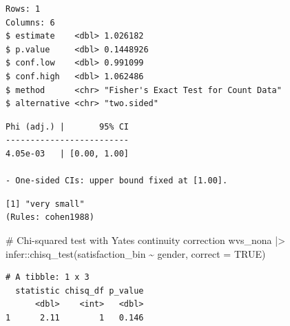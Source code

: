 \documentclass[
  letterpaper,
]{krantz}
\makeatletter
\newenvironment{Shaded}{\begin{snugshade}}{\end{snugshade}}
\newcommand{\AttributeTok}[1]{\textcolor[rgb]{0.40,0.45,0.13}{#1}}
\newcommand{\CommentTok}[1]{\textcolor[rgb]{0.37,0.37,0.37}{#1}}
\newcommand{\ConstantTok}[1]{\textcolor[rgb]{0.56,0.35,0.01}{#1}}
\newcommand{\DocumentationTok}[1]{\textcolor[rgb]{0.37,0.37,0.37}{\textit{#1}}}
\newcommand{\FunctionTok}[1]{\textcolor[rgb]{0.28,0.35,0.67}{#1}}
\newcommand{\NormalTok}[1]{\textcolor[rgb]{0.00,0.23,0.31}{#1}}
\newcommand{\OtherTok}[1]{\textcolor[rgb]{0.00,0.23,0.31}{#1}}
\newcommand{\SpecialCharTok}[1]{\textcolor[rgb]{0.37,0.37,0.37}{#1}}
\newcommand{\StringTok}[1]{\textcolor[rgb]{0.13,0.47,0.30}{#1}}
\newenvironment{kframe}{%
\medskip{}
\setlength{\fboxsep}{.8em}
 \def\at@end@of@kframe{}%
 \ifinner\ifhmode%
  \def\at@end@of@kframe{\end{minipage}}%
  \begin{minipage}{\columnwidth}%
 \fi\fi%
 \def\FrameCommand##1{\hskip\@totalleftmargin \hskip-\fboxsep
 \colorbox{shadecolor}{##1}\hskip-\fboxsep
     \hskip-\linewidth \hskip-\@totalleftmargin \hskip\columnwidth}%
 \MakeFramed {\advance\hsize-\width
   \@totalleftmargin\z@ \linewidth\hsize
   \@setminipage}}%
 {\par\unskip\endMakeFramed%
 \at@end@of@kframe}
\renewenvironment{Shaded}{\begin{kframe}}{\end{kframe}}
\makeatother
\begin{document}
\begin{verbatim}
Rows: 1
Columns: 6
$ estimate    <dbl> 1.026182
$ p.value     <dbl> 0.1448926
$ conf.low    <dbl> 0.991099
$ conf.high   <dbl> 1.062486
$ method      <chr> "Fisher's Exact Test for Count Data"
$ alternative <chr> "two.sided"
\end{verbatim}

\begin{Shaded}
\end{Shaded}

\begin{verbatim}
Phi (adj.) |       95% CI
-------------------------
4.05e-03   | [0.00, 1.00]

- One-sided CIs: upper bound fixed at [1.00].
\end{verbatim}

\begin{Shaded}
\end{Shaded}

\begin{verbatim}
[1] "very small"
(Rules: cohen1988)
\end{verbatim}

\begin{Shaded}
\begin{Highlighting}[]
\CommentTok{\# Chi{-}squared test with Yate\textquotesingle{}s continuity correction}
\NormalTok{wvs\_nona }\SpecialCharTok{|\textgreater{}}\NormalTok{ infer}\SpecialCharTok{::}\FunctionTok{chisq\_test}\NormalTok{(satisfaction\_bin }\SpecialCharTok{\textasciitilde{}}\NormalTok{ gender,}
                               \AttributeTok{correct =} \ConstantTok{TRUE}\NormalTok{)}
\end{Highlighting}
\end{Shaded}

\begin{verbatim}
# A tibble: 1 x 3
  statistic chisq_df p_value
      <dbl>    <int>   <dbl>
1      2.11        1   0.146
\end{verbatim}
\end{document}
